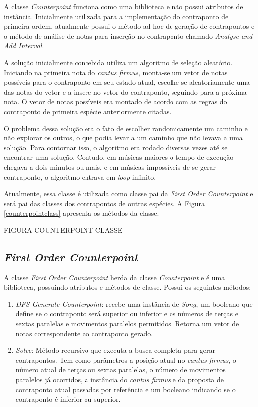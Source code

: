     A classe \textit{Counterpoint} funciona como uma biblioteca e não possui atributos de instância. Inicialmente utilizada para a implementação do contraponto de primeira ordem, atualmente possui o método ad-hoc de geração de contrapontos e o método de análise de notas para inserção no contraponto chamado \textit{Analyse and Add Interval}.

    A solução inicialmente concebida utiliza um algoritmo de seleção aleatório. Iniciando na primeira nota do \textit{cantus firmus}, monta-se um vetor de notas possíveis para o contraponto em seu estado atual, escolhe-se aleatoriamente uma das notas do vetor e a insere no vetor do contraponto, seguindo para a próxima nota. O vetor de notas possíveis era montado de acordo com as regras do contraponto de primeira espécie anteriormente citadas.

    O problema dessa solução era o fato de escolher randomicamente um caminho e não explorar os outros, o que podia levar a um caminho que não levava a uma solução. Para contornar isso, o algoritmo era rodado diversas vezes até se encontrar uma solução. Contudo, em músicas maiores o tempo de execução chegava a dois minutos ou mais, e em músicas impossíveis de se gerar contraponto, o algoritmo entrava em \textit{loop} infinito.

    Atualmente, essa classe é utilizada como classe pai da \textit{First Order Counterpoint} e será pai das classes dos contrapontos de outras espécies. A Figura \ref{counterpointclass} apresenta os métodos da classe.

    FIGURA COUNTERPOINT CLASSE

    \subsection[\textit{First Order Counterpoint}]{\textit{First Order Counterpoint}}

      A classe \textit{First Order Counterpoint} herda da classe \textit{Counterpoint} e é uma biblioteca, possuindo atributos e métodos de classe. Possui os seguintes métodos:

      \begin{enumerate}
        \item \textit{DFS Generate Counterpoint}: recebe uma instância de \textit{Song}, um booleano que define se o contraponto será superior ou inferior e os números de terças e sextas paralelas e movimentos paralelos permitidos. Retorna um vetor de notas correspondente ao contraponto gerado.
        \item \textit{Solve}: Método recursivo que executa a busca completa para gerar contrapontos. Tem como parâmetros a posição atual no \textit{cantus firmus}, o número atual de terças ou sextas paralelas, o número de movimentos paralelos já ocorridos, a instância do \textit{cantus firmus} e da proposta de contraponto atual passadas por referência e um booleano indicando se o contraponto é inferior ou superior.
      \end{enumerate}

